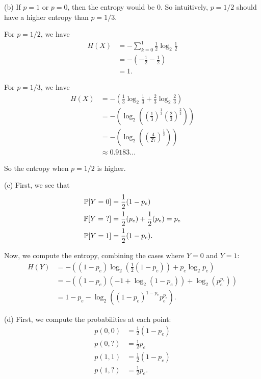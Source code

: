 \begin{enumerate}
    (b) If $p = 1$ or $p = 0$, then the entropy would be 0. So intuitively, $p = 1/2$ should have a higher entropy than $p = 1/3$.
    
    For $p = 1/2$, we have
    \begin{align*}
        H(X) &= -\sum_{k = 0}^1 \frac{1}{2}\log_2\frac{1}{2} \\
            &= -\left(-\frac{1}{2} - \frac{1}{2}\right) \\
            &= 1.
    \end{align*}
    
    For $p = 1/3$, we have
    \begin{align*}
        H(X) &= -\left(\frac{1}{3}\log_2\frac{1}{3} + \frac{2}{3}\log_2\frac{2}{3}\right) \\
            &= -\left(\log_2\left(\left(\frac{1}{3}\right)^{\frac{1}{3}}\left(\frac{2}{3}\right)^{\frac{2}{3}}\right)\right) \\
            &= -\left(\log_2\left(\left(\frac{4}{27}\right)^{\frac{1}{3}}\right)\right) \\
            &\approx 0.9183...
    \end{align*}
    
    So the entropy when $p = 1/2$ is higher.
    
    (c) First, we see that
    \begin{align*}
        \P[Y = 0] &= \frac{1}{2}(1 - p_e) \\
        \P[Y = ~?] &= \frac{1}{2}(p_e) + \frac{1}{2}(p_e) = p_e \\
        \P[Y = 1] &= \frac{1}{2}(1 - p_e).
    \end{align*}
    
    Now, we compute the entropy, combining the cases where $Y = 0$ and $Y = 1$:
    \begin{align*}
        H(Y) &= -\left((1 - p_e)\log_2\left(\frac{1}{2}(1 - p_e)\right) + p_e\log_2p_e\right) \\
            &= -\left((1 - p_e)(-1 + \log_2(1 - p_e)) + \log_2\left(p_e^{p_e}\right)\right) \\
            &= 1 - p_e - \log_2\left((1 - p_e)^{1 - p_e}p_e^{p_e}\right).
    \end{align*}
    
    (d) First, we compute the probabilities at each point:
    \begin{align*}
        p(0, 0) &= \frac{1}{2}(1 - p_e) \\
        p(0, ?) &= \frac{1}{2}p_e \\
        p(1, 1) &= \frac{1}{2}(1 - p_e) \\
        p(1, ?) &= \frac{1}{2}p_e.
    \end{align*}
    

\end{enumerate}
